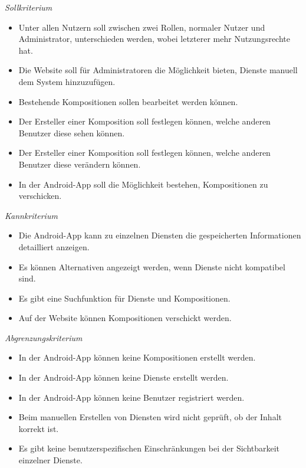 \textit{Sollkriterium}

\begin{itemize}[leftmargin=4pc]
	\item Unter allen Nutzern soll zwischen zwei Rollen, normaler Nutzer und Administrator, unterschieden werden, wobei letzterer mehr Nutzungsrechte hat.
	\item Die Website soll für Administratoren die Möglichkeit bieten, Dienste manuell dem System hinzuzufügen.
	\item Bestehende Kompositionen sollen bearbeitet werden können.
	\item Der Ersteller einer Komposition soll festlegen können, welche anderen Benutzer diese sehen können.
	\item Der Ersteller einer Komposition soll festlegen können, welche anderen Benutzer diese verändern können.
	\item In der Android-App soll die Möglichkeit bestehen, Kompositionen zu verschicken.
\end{itemize}

\textit{Kannkriterium}

\begin{itemize}[leftmargin=4pc]
	\item Die Android-App kann zu einzelnen Diensten die gespeicherten Informationen detailliert anzeigen.
	\item Es können Alternativen angezeigt werden, wenn Dienste nicht kompatibel sind.
	\item Es gibt eine Suchfunktion für Dienste und Kompositionen.
	\item Auf der Website können Kompositionen verschickt werden.
\end{itemize}

\textit{Abgrenzungskriterium}

\begin{itemize}[leftmargin=4pc]
	\item In der Android-App können keine Kompositionen erstellt werden.
	\item In der Android-App können keine Dienste erstellt werden.
	\item In der Android-App können keine Benutzer registriert werden.
	\item Beim manuellen Erstellen von Diensten wird nicht geprüft, ob der Inhalt korrekt ist.
	\item Es gibt keine benutzerspezifischen Einschränkungen bei der Sichtbarkeit einzelner Dienste. \\
\end{itemize}


